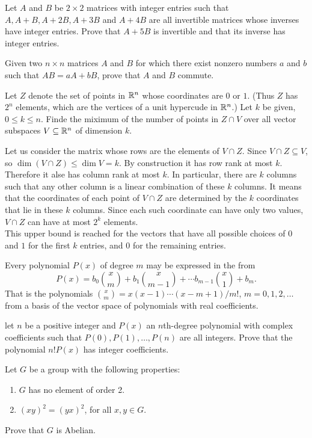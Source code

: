 \question Let $A$ and $B$ be $2\times 2$ matrices with integer entries such that $A, A+B, A+2B, A+3B$ and $A+4B$ are all invertible matrices whose inverses have integer entries. Prove that $A+5B$ is invertible and that its inverse has integer entries.

\question Given two $n\times n$ matrices $A$ and $B$ for which there exist nonzero numbers $a$ and $b$ such that $AB=aA+bB$, prove that $A$ and $B$ commute.

\question Let $Z$ denote the set of points in $\mathbb{R}^n$ whose coordinates are $0$ or $1$. (Thus $Z$ has $2^n$ elements, which are the vertices of a unit hypercude in $\mathbb{R}^n$.) Let $k$ be given, $0\leq k\leq n$. Finde the miximum of the number of points in $Z\cap V$ over all vector subspaces $V\subseteq\mathbb{R}^n$ of dimension $k$.

\begin{solution}
    Let us consider the matrix whose rows are the elements of $V\cap Z$. Since $V\cap Z\subseteq V$, so $\dim{(V\cap Z)}\leq\dim{V}=k$. By construction it has row rank at most $k$. Therefore it alse has column rank at most $k$. In particular, there are $k$ columns such that any other column is a linear combination of these $k$ columns. It means that the coordinates of each point of $V\cap Z$ are determined by the $k$ coordinates that lie in these $k$ columns. Since each such coordinate can have only two values, $V\cap Z$ can have at most $2^k$ elements.\\
    This upper bound is reached for the vectors that have all possible choices of $0$ and $1$ for the first $k$ entries, and $0$ for the remaining entries.
\end{solution}

 Every polynomial $P(x)$ of degree $m$ may be expressed in the from
$$P(x)=b_0\binom{x}{m}+b_1\binom{x}{m-1}+\cdots b_{m-1}\binom{x}{1}+b_m.$$
That is the polynomials $\binom{x}{m}=x(x-1)\cdots(x-m+1)/m!$, $m=0, 1, 2,\ldots$ from a basis of the vector space of polynomials with real coefficients.

\question[P\&B, 242] let $n$ be a positive integer and $P(x)$ an $n$th-degree polynomial with complex coefficients such that $P(0), P(1), \ldots, P(n)$ are all integers. Prove that the polynomial $n!P(x)$ has integer coefficients.

\question[P\&B, 282] Let $G$ be a group with the following properties:
\begin{enumerate}
    \item $G$ has no element of order 2.
    \item $(xy)^2=(yx)^2$, for all $x,y\in G$.
\end{enumerate}
Prove that $G$ is Abelian.

